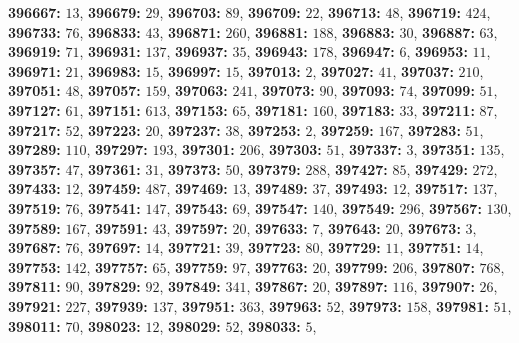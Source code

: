 \textsf{\bfseries 396667:} $13$, \textsf{\bfseries 396679:} $29$, \textsf{\bfseries 396703:} $89$, \textsf{\bfseries 396709:} $22$, \textsf{\bfseries 396713:} $48$, \textsf{\bfseries 396719:} $424$, \textsf{\bfseries 396733:} $76$, \textsf{\bfseries 396833:} $43$, \textsf{\bfseries 396871:} $260$, \textsf{\bfseries 396881:} $188$, \textsf{\bfseries 396883:} $30$, \textsf{\bfseries 396887:} $63$, \textsf{\bfseries 396919:} $71$, \textsf{\bfseries 396931:} $137$, \textsf{\bfseries 396937:} $35$, \textsf{\bfseries 396943:} $178$, \textsf{\bfseries 396947:} $6$, \textsf{\bfseries 396953:} $11$, \textsf{\bfseries 396971:} $21$, \textsf{\bfseries 396983:} $15$, \textsf{\bfseries 396997:} $15$, \textsf{\bfseries 397013:} $2$, \textsf{\bfseries 397027:} $41$, \textsf{\bfseries 397037:} $210$, \textsf{\bfseries 397051:} $48$, \textsf{\bfseries 397057:} $159$, \textsf{\bfseries 397063:} $241$, \textsf{\bfseries 397073:} $90$, \textsf{\bfseries 397093:} $74$, \textsf{\bfseries 397099:} $51$, \textsf{\bfseries 397127:} $61$, \textsf{\bfseries 397151:} $613$, \textsf{\bfseries 397153:} $65$, \textsf{\bfseries 397181:} $160$, \textsf{\bfseries 397183:} $33$, \textsf{\bfseries 397211:} $87$, \textsf{\bfseries 397217:} $52$, \textsf{\bfseries 397223:} $20$, \textsf{\bfseries 397237:} $38$, \textsf{\bfseries 397253:} $2$, \textsf{\bfseries 397259:} $167$, \textsf{\bfseries 397283:} $51$, \textsf{\bfseries 397289:} $110$, \textsf{\bfseries 397297:} $193$, \textsf{\bfseries 397301:} $206$, \textsf{\bfseries 397303:} $51$, \textsf{\bfseries 397337:} $3$, \textsf{\bfseries 397351:} $135$, \textsf{\bfseries 397357:} $47$, \textsf{\bfseries 397361:} $31$, \textsf{\bfseries 397373:} $50$, \textsf{\bfseries 397379:} $288$, \textsf{\bfseries 397427:} $85$, \textsf{\bfseries 397429:} $272$, \textsf{\bfseries 397433:} $12$, \textsf{\bfseries 397459:} $487$, \textsf{\bfseries 397469:} $13$, \textsf{\bfseries 397489:} $37$, \textsf{\bfseries 397493:} $12$, \textsf{\bfseries 397517:} $137$, \textsf{\bfseries 397519:} $76$, \textsf{\bfseries 397541:} $147$, \textsf{\bfseries 397543:} $69$, \textsf{\bfseries 397547:} $140$, \textsf{\bfseries 397549:} $296$, \textsf{\bfseries 397567:} $130$, \textsf{\bfseries 397589:} $167$, \textsf{\bfseries 397591:} $43$, \textsf{\bfseries 397597:} $20$, \textsf{\bfseries 397633:} $7$, \textsf{\bfseries 397643:} $20$, \textsf{\bfseries 397673:} $3$, \textsf{\bfseries 397687:} $76$, \textsf{\bfseries 397697:} $14$, \textsf{\bfseries 397721:} $39$, \textsf{\bfseries 397723:} $80$, \textsf{\bfseries 397729:} $11$, \textsf{\bfseries 397751:} $14$, \textsf{\bfseries 397753:} $142$, \textsf{\bfseries 397757:} $65$, \textsf{\bfseries 397759:} $97$, \textsf{\bfseries 397763:} $20$, \textsf{\bfseries 397799:} $206$, \textsf{\bfseries 397807:} $768$, \textsf{\bfseries 397811:} $90$, \textsf{\bfseries 397829:} $92$, \textsf{\bfseries 397849:} $341$, \textsf{\bfseries 397867:} $20$, \textsf{\bfseries 397897:} $116$, \textsf{\bfseries 397907:} $26$, \textsf{\bfseries 397921:} $227$, \textsf{\bfseries 397939:} $137$, \textsf{\bfseries 397951:} $363$, \textsf{\bfseries 397963:} $52$, \textsf{\bfseries 397973:} $158$, \textsf{\bfseries 397981:} $51$, \textsf{\bfseries 398011:} $70$, \textsf{\bfseries 398023:} $12$, \textsf{\bfseries 398029:} $52$, \textsf{\bfseries 398033:} $5$, 
